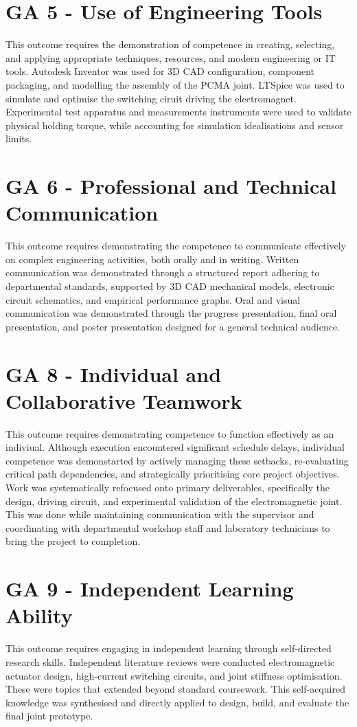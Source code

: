 \section*{GA 5 - Use of Engineering Tools}
 
This outcome requires the demonstration of competence in creating, selecting, and applying appropriate techniques, resources, and modern engineering or IT tools. Autodesk Inventor was used for 3D CAD configuration, component packaging, and modelling the assembly of the PCMA joint. LTSpice was used to simulate and optimise the switching ciruit driving the electromagnet. Experimental test apparatus and measurements instruments were used to validate physical holding torque, while accounting for simulation idealisations and sensor limits.

\section*{GA 6 - Professional and Technical Communication}

This outcome requires demonstrating the competence to communicate effectively on complex engineering activities, both orally and in writing. Written communication was demonstrated through a structured report adhering to departmental standards, supported by 3D CAD mechanical models, electronic circuit schematics, and empirical performance graphs. Oral and visual communication was demonstrated through the progress presentation, final oral presentation, and poster presentation designed for a general technical audience.

\section*{GA 8 - Individual and Collaborative Teamwork}

This outcome requires demonstrating competence to function effectively as an indiviual. Although execution encountered significant schedule delays, individual competence was demonstarted by actively managing these setbacks, re-evaluating critical path dependencies, and strategically prioritising core project objectives. Work was systematically refocused onto primary deliverables, specifically the design, driving circuit, and experimental validation of the electromagnetic joint. This was done while maintaining communication with the supervisor and coordinating with departmental workshop staff and laboratory technicians to bring the project to completion.

\section*{GA 9 - Independent Learning Ability}

This outcome requires engaging in independent learning through self-directed research skills. Independent literature reviews were conducted electromagnetic actuator design, high-current switching circuits, and joint stiffness optimisation. These were topics that extended beyond standard coursework. This self-acquired knowledge was synthesised and directly applied to design, build, and evaluate the final joint prototype.
